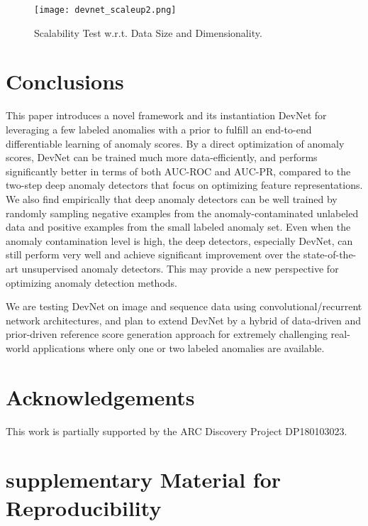 \documentclass[sigconf]{acmart}
\begin{document}
\begin{figure}[h!]
  \centering
    \texttt{[image: devnet\_scaleup2.png]}
  \caption{Scalability Test w.r.t. Data Size and Dimensionality.}
  \label{fig:scaleup}
\end{figure}

\section{Conclusions}

This paper introduces a novel framework and its instantiation DevNet for leveraging a few labeled anomalies with a prior to fulfill an end-to-end differentiable learning of anomaly scores. By a direct optimization of anomaly scores, DevNet can be trained much more data-efficiently, and performs significantly better in terms of both AUC-ROC and AUC-PR, compared to the two-step deep anomaly detectors that focus on optimizing feature representations. We also find empirically that deep anomaly detectors can be well trained by randomly sampling negative examples from the anomaly-contaminated unlabeled data and positive examples from the small labeled anomaly set. Even when the anomaly contamination level is high, the deep detectors, especially DevNet, can still perform very well and achieve significant improvement over the state-of-the-art unsupervised anomaly detectors. This may provide a new perspective for optimizing anomaly detection methods.

We are testing DevNet on image and sequence data using convolutional/recurrent network architectures, and plan to extend DevNet by a hybrid of data-driven and prior-driven reference score generation approach for extremely challenging real-world applications where only one or two labeled anomalies are available.

\section*{Acknowledgements}
This work is partially supported by the ARC Discovery Project DP180103023.


\balance


\appendix
\section{supplementary Material for Reproducibility}
\end{document}
